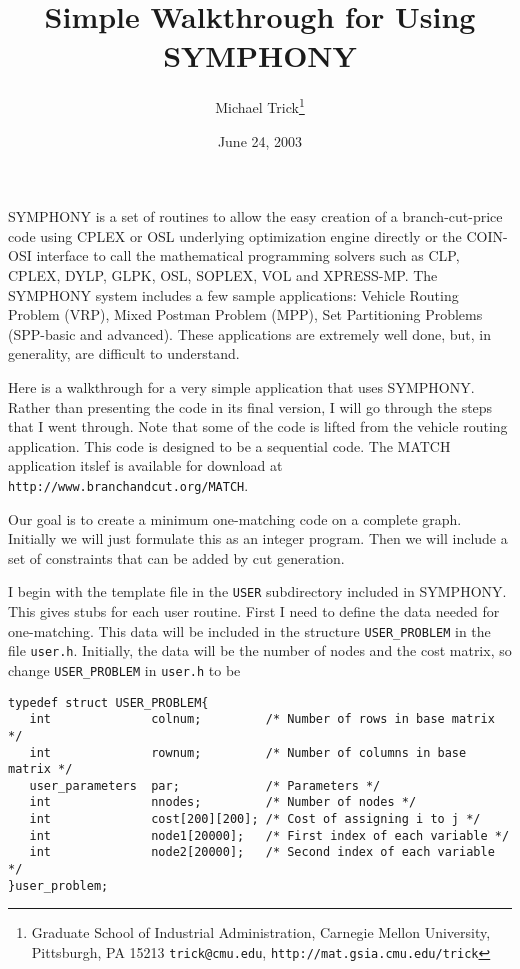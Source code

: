 \documentclass[11pt]{article}
\begin{document}
\title{Simple Walkthrough for Using SYMPHONY}
\author{Michael Trick\thanks{Graduate School of Industrial Administration,
Carnegie Mellon University, Pittsburgh, PA 15213 \texttt{trick@cmu.edu}, 
\texttt{http://mat.gsia.cmu.edu/trick}}}

\date{June 24, 2003}
\maketitle
\thispagestyle{empty}

SYMPHONY is a set of routines to allow the easy creation of a branch-cut-price
code using CPLEX or OSL underlying optimization engine directly or the 
COIN-OSI interface to call the mathematical programming solvers such as CLP, 
CPLEX, DYLP, GLPK, OSL, SOPLEX, VOL and XPRESS-MP. The SYMPHONY system 
includes a few sample applications: Vehicle Routing Problem (VRP), Mixed 
Postman Problem (MPP), Set Partitioning Problems (SPP-basic and advanced). 
These applications are extremely well done, but, in generality, are difficult 
to understand.

Here is a walkthrough for a very simple application that uses SYMPHONY. Rather
than presenting the code in its final version, I will go through the steps 
that I went through. Note that some of the code is lifted from the vehicle 
routing application. This code is designed to be a sequential code. The MATCH application itslef is available for download at 
\texttt{http://www.branchandcut.org/MATCH}. 

Our goal is to create a minimum one-matching code on a complete graph.
Initially we will just formulate this as an integer program. Then we will
include a set of constraints that can be added by cut generation.

I begin with the template file in the \texttt{USER} subdirectory included in
SYMPHONY. This gives stubs for each user routine. First I need to define the
data needed for one-matching. This data will be included in the structure
\texttt{USER\_PROBLEM} in the file \texttt{user.h}.  Initially, the data will
be the number of nodes and the cost matrix, so change \texttt{USER\_PROBLEM}
in \texttt{user.h} to be

\begin{verbatim}
typedef struct USER_PROBLEM{
   int              colnum;         /* Number of rows in base matrix */
   int              rownum;         /* Number of columns in base matrix */
   user_parameters  par;            /* Parameters */
   int              nnodes;         /* Number of nodes */
   int              cost[200][200]; /* Cost of assigning i to j */ 
   int              node1[20000];   /* First index of each variable */
   int              node2[20000];   /* Second index of each variable */
}user_problem;
\end{verbatim}
\end{document}
